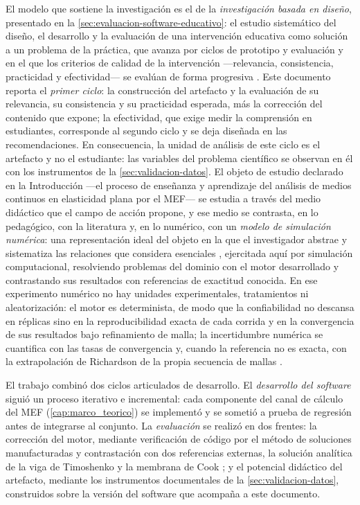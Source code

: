 El modelo que sostiene la investigación es el de la \emph{investigación basada en diseño}, presentado en la \autoref{sec:evaluacion-software-educativo}: el estudio sistemático del diseño, el desarrollo y la evaluación de una intervención educativa como solución a un problema de la práctica, que avanza por ciclos de prototipo y evaluación y en el que los criterios de calidad de la intervención —relevancia, consistencia, practicidad y efectividad— se evalúan de forma progresiva \autocite{plomp2013edr,nieveen2013formative}. Este documento reporta el \emph{primer ciclo}: la construcción del artefacto y la evaluación de su relevancia, su consistencia y su practicidad esperada, más la corrección del contenido que expone; la efectividad, que exige medir la comprensión en estudiantes, corresponde al segundo ciclo y se deja diseñada en las recomendaciones. En consecuencia, la unidad de análisis de este ciclo es el artefacto y no el estudiante: las variables del problema científico se observan en él con los instrumentos de la \autoref{sec:validacion-datos}. El objeto de estudio declarado en la Introducción —el proceso de enseñanza y aprendizaje del análisis de medios continuos en elasticidad plana por el MEF— se estudia a través del medio didáctico que el campo de acción propone, y ese medio se contrasta, en lo pedagógico, con la literatura y, en lo numérico, con un \emph{modelo de simulación numérica}: una representación ideal del objeto en la que el investigador abstrae y sistematiza las relaciones que considera esenciales \autocite[p.~21]{alvarez_metodologia}, ejercitada aquí por simulación computacional, resolviendo problemas del dominio con el motor desarrollado y contrastando sus resultados con referencias de exactitud conocida. En ese experimento numérico no hay unidades experimentales, tratamientos ni aleatorización: el motor es determinista, de modo que la confiabilidad no descansa en réplicas sino en la reproducibilidad exacta de cada corrida y en la convergencia de sus resultados bajo refinamiento de malla; la incertidumbre numérica se cuantifica con las tasas de convergencia y, cuando la referencia no es exacta, con la extrapolación de Richardson de la propia secuencia de mallas \autocite[pp.~309-312]{oberkampf2010vv}.

El trabajo combinó dos ciclos articulados de desarrollo. El \emph{desarrollo del software} siguió un proceso iterativo e incremental: cada componente del canal de cálculo del MEF (\autoref{cap:marco_teorico}) se implementó y se sometió a prueba de regresión antes de integrarse al conjunto. La \emph{evaluación} se realizó en dos frentes: la corrección del motor, mediante verificación de código por el método de soluciones manufacturadas y contrastación con dos referencias externas, la solución analítica de la viga de Timoshenko y la membrana de Cook \autocite{oberkampf2010vv,salari2000mms}; y el potencial didáctico del artefacto, mediante los instrumentos documentales de la \autoref{sec:validacion-datos}, construidos sobre la versión del software que acompaña a este documento.

